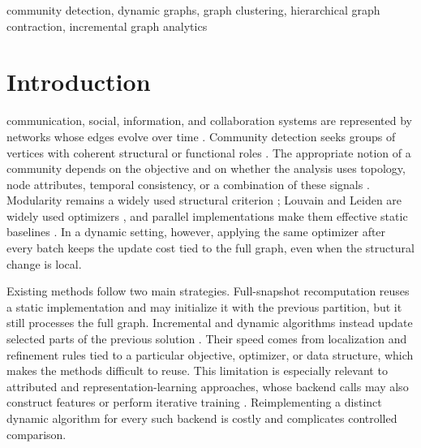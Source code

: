 \documentclass{ieeeaccess}
\begin{document}
\begin{keywords}
community detection, dynamic graphs, graph clustering, hierarchical graph
contraction, incremental graph analytics
\end{keywords}

\titlepgskip=-21pt
\maketitle

\section{Introduction}
\label{sec:introduction}
 communication, social, information, and collaboration
systems are represented by networks whose edges evolve over time
\cite{Onnela2007,Palla2007,Rossetti2018}. Community detection seeks groups of
vertices with coherent structural or functional roles
\cite{Porter2009,Fortunato2010,Radicchi2004,Flake2002}. The appropriate notion
of a community depends on the objective and on whether the analysis uses
topology, node attributes, temporal consistency, or a combination of these
signals \cite{Fortunato2016,Chunaev2020}. Modularity remains a widely used
structural criterion \cite{Newman2004,Brandes2008}; Louvain and Leiden are
widely used optimizers \cite{Blondel2008,Traag2019}, and parallel
implementations make them effective static baselines
\cite{Lu2015,Sahu2024FastLeiden}. In a dynamic setting, however, applying the
same optimizer after every batch keeps the update cost tied to the full graph,
even when the structural change is local.

Existing methods follow two main strategies. Full-snapshot recomputation reuses
a static implementation and may initialize it with the previous partition, but
it still processes the full graph. Incremental and dynamic algorithms instead
update selected parts of the previous solution
\cite{Halappanavar2017,Zhuang2021DynaMo,Zarayeneh2021DeltaScreening,
Sahu2025Dynamic}. Their speed comes from localization and refinement rules tied
to a particular objective, optimizer, or data structure, which makes the
methods difficult to reuse. This limitation is especially relevant to
attributed and representation-learning approaches, whose backend calls may
also construct features or perform iterative training
\cite{Tsitsulin2023DMoN,Liu2024MAGI,Lin2025S2CAG}. Reimplementing a distinct
dynamic algorithm for every such backend is costly and complicates controlled
comparison.
\end{document}
